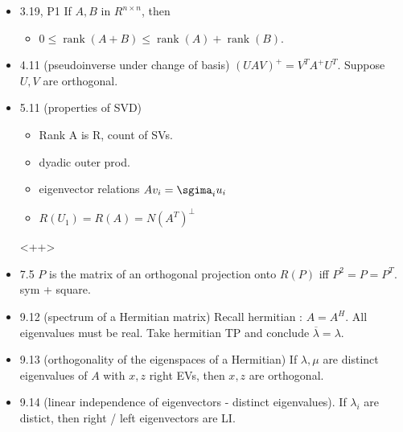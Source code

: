 \documentclass{article}
\newcommand{\ol}{\overline}
\DeclareMathOperator{\rank}{rank}
\begin{document}
\begin{itemize}
  \item 3.19, P1  If $A, B$ in $R^{n \times n}$, then

    \begin{itemize}
      \item $0 \leq \rank(A+B) \leq \rank(A) + \rank(B)$.
    \end{itemize}

  \item 4.11 (pseudoinverse under change of basis)  $(U A V)^{+} = V^T A^{+} U^T$.  Suppose $U, V$ are orthogonal.  
  \item 5.11 (properties of SVD)
    \begin{itemize}
      \item Rank A is R, count of SVs.
      \item dyadic outer prod.
      \item eigenvector relations $A v_i = \sgima_i u_i$
      \item $R(U_1) = R(A) = N(A^T)^{\perp}$
    \end{itemize}<++>

  \item 7.5 $P$ is the matrix of an orthogonal projection onto $R(P)$ iff $P^2 = P = P^T$.  sym + square.

  \item 9.12 (spectrum of a Hermitian matrix)  Recall hermitian : $A = A^H$.  All eigenvalues must be real.  Take hermitian TP and conclude $\ol{\lambda} = \lambda$.

  \item 9.13 (orthogonality of the eigenspaces of a Hermitian) If $\lambda, \mu$ are distinct eigenvalues of $A$ with $x, z$ right EVs, then $x, z$ are orthogonal.
  \item 9.14 (linear independence of eigenvectors - distinct eigenvalues).  If $\lambda_i$ are distict, then right / left eigenvectors are LI.
\end{itemize}
\end{document}

